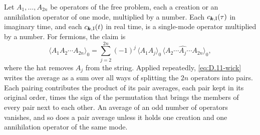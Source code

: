 Let $A_1, \dots, A_{2n}$ be operators of the free problem, each a creation or an annihilation operator of one mode, multiplied by a number. Each $c_{\bm{k},\mathrm{I}}(\tau)$ in imaginary time, and each $c_{\bm{k},\mathrm{I}}(t)$ in real time, is a single-mode operator multiplied by a number. For fermions, the claim is
\begin{equation}
  \langle A_1A_2\cdots A_{2n}\rangle_0 = \sum_{j=2}^{2n}(-1)^j\,\langle A_1A_j\rangle_0\,\langle A_2\cdots\widehat{A_j}\cdots A_{2n}\rangle_0 ,
  \label{eq:D.11-wick}
\end{equation}
where the hat removes $A_j$ from the string. Applied repeatedly, \cref{eq:D.11-wick} writes the average as a sum over all ways of splitting the $2n$ operators into pairs. Each pairing contributes the product of its pair averages, each pair kept in its original order, times the sign of the permutation that brings the members of every pair next to each other. An average of an odd number of operators vanishes, and so does a pair average unless it holds one creation and one annihilation operator of the same mode.

